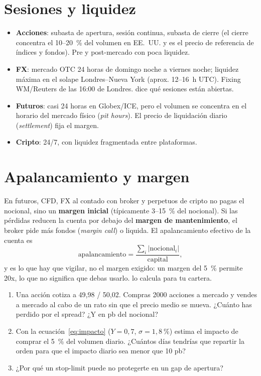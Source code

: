 \section{Sesiones y liquidez}
\begin{itemize}
\item \textbf{Acciones}: subasta de apertura, sesión continua, subasta de cierre (el cierre concentra
  el 10--20~\% del volumen en EE.~UU. y es el precio de referencia de índices y fondos). Pre y
  post-mercado con poca liquidez.
\item \textbf{FX}: mercado OTC 24 horas de domingo noche a viernes noche; liquidez máxima en el solape
  Londres--Nueva York (aprox. 12--16~h UTC). Fixing WM/Reuters de las 16:00 de Londres.
   dice qué sesiones están abiertas.
\item \textbf{Futuros}: casi 24 horas en Globex/ICE, pero el volumen se concentra en el horario del
  mercado físico (\emph{pit hours}). El precio de liquidación diario (\emph{settlement}) fija el margen.
\item \textbf{Cripto}: 24/7, con liquidez fragmentada entre plataformas.
\end{itemize}

\section{Apalancamiento y margen}
En futuros, CFD, FX al contado con broker y perpetuos de cripto no pagas el nocional, sino un
\textbf{margen inicial} (típicamente 3--15~\% del nocional). Si las pérdidas reducen la cuenta por debajo
del \textbf{margen de mantenimiento}, el broker pide más fondos (\emph{margin call}) o liquida. El
apalancamiento efectivo de la cuenta es
\[
\text{apalancamiento} = \frac{\sum_i |\text{nocional}_i|}{\text{capital}} ,
\]
y es lo que hay que vigilar, no el margen exigido: un margen del 5~\% permite 20x, lo que no significa
que debas usarlo.  lo calcula para tu cartera.

\begin{ejercicios}
\begin{enumerate}
\item Una acción cotiza a 49,98 / 50,02. Compras 2000 acciones a mercado y vendes a mercado al cabo de
  un rato sin que el precio medio se mueva. ¿Cuánto has perdido por el spread? ¿Y en pb del nocional?
\item Con la ecuación~\eqref{eq:impacto} ($Y=0{,}7$, $\sigma=1{,}8~\%$) estima el impacto de comprar el
  5~\% del volumen diario. ¿Cuántos días tendrías que repartir la orden para que el impacto diario sea
  menor que 10 pb?
\item ¿Por qué un stop-limit puede no protegerte en un gap de apertura?
\end{enumerate}
\end{ejercicios}
